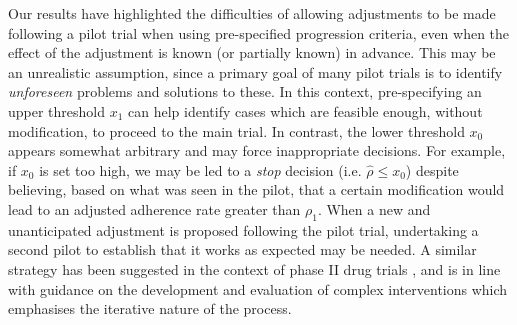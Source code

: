 \documentclass{bmcart}
\begin{document}
Our results have highlighted the difficulties of allowing adjustments to be made following a pilot trial when using pre-specified progression criteria, even when the effect of the adjustment is known (or partially known) in advance. This may be an unrealistic assumption, since a primary goal of many pilot trials is to identify \emph{unforeseen} problems and solutions to these. In this context, pre-specifying an upper threshold $x_1$ can help identify cases which are feasible enough, without modification, to proceed to the main trial. In contrast, the lower threshold $x_0$ appears somewhat arbitrary and may force inappropriate decisions. For example, if $x_0$ is set too high, we may be led to a \emph{stop} decision (i.e. $\hat{\rho} \leq x_0$) despite believing, based on what was seen in the pilot, that a certain modification would lead to an adjusted adherence rate greater than $\rho_1$. When a new and unanticipated adjustment is proposed following the pilot trial, undertaking a second pilot to establish that it works as expected may be needed. A similar strategy has been suggested in the context of phase II drug trials \cite{Brown2012}, and is in line with guidance on the development and evaluation of complex interventions \cite{Skivington2021} which emphasises the iterative nature of the process.


\end{document}
